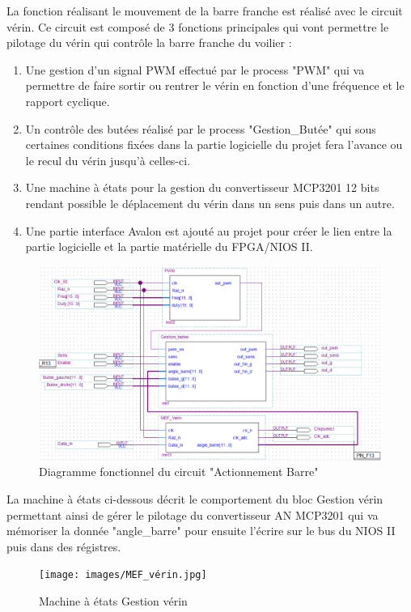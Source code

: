   La fonction réalisant le mouvement de la barre franche est réalisé avec le circuit vérin. Ce circuit est composé de 3 fonctions principales qui vont permettre le pilotage du vérin qui contrôle la barre franche du voilier :\vspace{0.5cm}
\begin{enumerate}
    \item Une gestion d'un signal PWM effectué par le process "PWM" qui va permettre de faire sortir ou rentrer le vérin en fonction d'une fréquence et le rapport cyclique. 
    \item Un contrôle des butées réalisé par le process "Gestion\_Butée" qui sous certaines conditions fixées dans la partie logicielle du projet fera l'avance ou le recul du vérin jusqu'à celles-ci.
    \item Une machine à états pour la gestion du convertisseur MCP3201 12 bits rendant possible le déplacement du vérin dans un sens puis dans un autre.
    \item Une partie interface Avalon est ajouté au projet pour créer le lien entre la partie logicielle et la partie matérielle du FPGA/NIOS II.
\end{enumerate} 

  \begin{figure}[h]
    \begin{center}
      \includegraphics[width=\textwidth]{images/verin.png}
      \caption{Diagramme fonctionnel du circuit "Actionnement Barre"}
    \end{center}
  \end{figure}

\newpage 

La machine à états ci-dessous décrit le comportement du bloc Gestion vérin permettant ainsi de gérer le pilotage du convertisseur AN MCP3201 qui va mémoriser la donnée "angle\_barre" pour ensuite l'écrire sur le bus du NIOS II puis dans des régistres.
\vspace{1cm}
  \begin{figure}[h]
    \begin{center}
      \texttt{[image: images/MEF\_vérin.jpg]}
      \caption{Machine à états Gestion vérin}
    \end{center}
  \end{figure}

